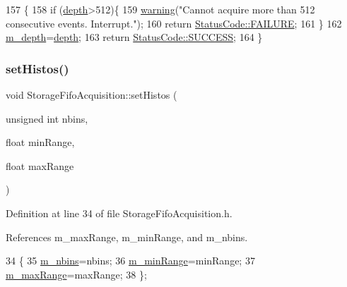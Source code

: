 \begin{DoxyCode}
157                                                                \{
158   \textcolor{keywordflow}{if} (\hyperlink{classStorageFifoAcquisition_a2d549502ced65dc2e02500d2216ad23b}{depth}>512)\{
159     \hyperlink{classObject_a65cd4fda577711660821fd2cd5a3b4c9}{warning}(\textcolor{stringliteral}{"Cannot acquire more than 512 consecutive events. Interrupt."});
160     \textcolor{keywordflow}{return} \hyperlink{classStatusCode_a6f565cbeadc76d14c72f047e5e85eb4ba3da73d4c469762eb9d3c960368252b26}{StatusCode::FAILURE};
161   \}
162   \hyperlink{classStorageFifoAcquisition_a6bebf76cce0ccaae599c844a69ebd19d}{m\_depth}=\hyperlink{classStorageFifoAcquisition_a2d549502ced65dc2e02500d2216ad23b}{depth};
163   \textcolor{keywordflow}{return} \hyperlink{classStatusCode_a6f565cbeadc76d14c72f047e5e85eb4badd0da38d3ba0d922efd1f4619bc37ad8}{StatusCode::SUCCESS};
164 \}
\end{DoxyCode}
\mbox{\label{classStorageFifoAcquisition_af1482fb0a9e3cd5210902cf96b3f5313}} 
\subsubsection{\texorpdfstring{set\+Histos()}{setHistos()}}
{\footnotesize\ttfamily void Storage\+Fifo\+Acquisition\+::set\+Histos (\begin{DoxyParamCaption}\item[{unsigned int}]{nbins,  }\item[{float}]{min\+Range,  }\item[{float}]{max\+Range }\end{DoxyParamCaption})\hspace{0.3cm}{\ttfamily [inline]}}



Definition at line 34 of file Storage\+Fifo\+Acquisition.\+h.



References m\+\_\+max\+Range, m\+\_\+min\+Range, and m\+\_\+nbins.


\begin{DoxyCode}
34                                                                     \{
35     \hyperlink{classStorageFifoAcquisition_af5f50ba5a71654324d96eddc4d578571}{m\_nbins}=nbins;
36     \hyperlink{classStorageFifoAcquisition_ad3cf1ef4173ffe14a0e86b7b8ec8d90b}{m\_minRange}=minRange;
37     \hyperlink{classStorageFifoAcquisition_adbe54adb957ea13ae6ff9e56b7e398c8}{m\_maxRange}=maxRange;
38   \};
\end{DoxyCode}


